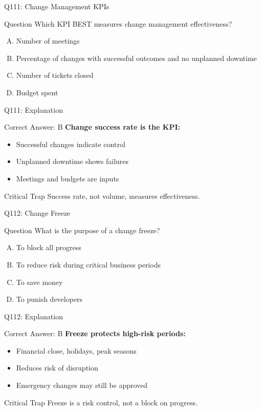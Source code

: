 \documentclass{beamer}
\begin{document}
	\begin{frame}{Q111: Change Management KPIs}
		\begin{block}{Question}
			Which KPI BEST measures change management effectiveness?
		\end{block}
		\begin{enumerate}[(A)]
			\item Number of meetings
			\item Percentage of changes with successful outcomes and no unplanned downtime
			\item Number of tickets closed
			\item Budget spent
		\end{enumerate}
	\end{frame}
	
	\begin{frame}{Q111: Explanation}
		\begin{block}{Correct Answer: B}
			\textbf{Change success rate is the KPI:}
			\begin{itemize}
				\item Successful changes indicate control
				\item Unplanned downtime shows failures
				\item Meetings and budgets are inputs
			\end{itemize}
		\end{block}
		\begin{alertblock}{Critical Trap}
			Success rate, not volume, measures effectiveness.
		\end{alertblock}
	\end{frame}
	
	\begin{frame}{Q112: Change Freeze}
		\begin{block}{Question}
			What is the purpose of a change freeze?
		\end{block}
		\begin{enumerate}[(A)]
			\item To block all progress
			\item To reduce risk during critical business periods
			\item To save money
			\item To punish developers
		\end{enumerate}
	\end{frame}
	
	\begin{frame}{Q112: Explanation}
		\begin{block}{Correct Answer: B}
			\textbf{Freeze protects high-risk periods:}
			\begin{itemize}
				\item Financial close, holidays, peak seasons
				\item Reduces risk of disruption
				\item Emergency changes may still be approved
			\end{itemize}
		\end{block}
		\begin{alertblock}{Critical Trap}
			Freeze is a risk control, not a block on progress.
		\end{alertblock}
	\end{frame}
	
\end{document}
